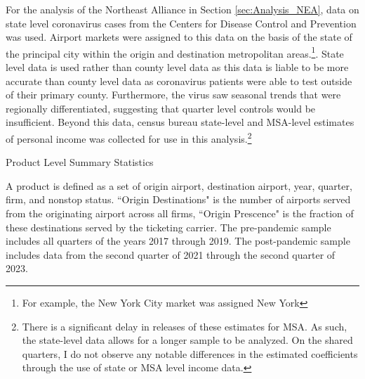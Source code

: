 \documentclass{article}
\begin{document}
	
	For the analysis of the Northeast Alliance in Section \ref{sec:Analysis_NEA}, data on state level coronavirus cases from the Centers for Disease Control and Prevention was used. Airport markets were assigned to this data on the basis of the state of the principal city within the origin and destination metropolitan areas.\footnote{For example, the New York City market was assigned New York}. State level data is used rather than county level data as this data is liable to be more accurate than county level data as coronavirus patients were able to test outside of their primary county. Furthermore, the virus saw seasonal trends that were regionally differentiated, suggesting that quarter level controls would be insufficient. Beyond this data, census bureau state-level and MSA-level estimates of personal income was collected for use in this analysis.\footnote{There is a significant delay in releases of these estimates for MSA. As such, the state-level data allows for a longer sample to be analyzed. On the shared quarters, I do not observe any notable differences in the estimated coefficients through the use of state or MSA level income data.}

    \begin{table}
    \caption{Product Level Summary Statistics}
    \label{tab:Summary_Statistics_Product}
                    \vspace{-15mm}
                    \begin{center}
    
    \footnotesize{A product is defined as a set of origin airport, destination airport, year, quarter, firm, and nonstop status. ``Origin Destinations" is the number of airports served from the originating airport across all firms, ``Origin Prescence" is the fraction of these destinations served by the ticketing carrier. The pre-pandemic sample includes all quarters of the years 2017 through 2019. The post-pandemic sample includes data from the second quarter of 2021 through the second quarter of 2023.}
                    \end{center}
    \end{table}
\end{document}
